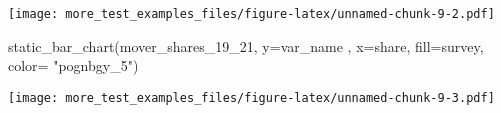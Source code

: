 \documentclass[
]{article}
\newenvironment{Shaded}{\begin{snugshade}}{\end{snugshade}}
\newcommand{\AttributeTok}[1]{\textcolor[rgb]{0.77,0.63,0.00}{#1}}
\newcommand{\FunctionTok}[1]{\textcolor[rgb]{0.00,0.00,0.00}{#1}}
\newcommand{\NormalTok}[1]{#1}
\newcommand{\StringTok}[1]{\textcolor[rgb]{0.31,0.60,0.02}{#1}}
\begin{document}
\texttt{[image: more\_test\_examples\_files/figure-latex/unnamed-chunk-9-2.pdf]}

\begin{Shaded}
\begin{Highlighting}[]
\FunctionTok{static\_bar\_chart}\NormalTok{(mover\_shares\_19\_21, }\AttributeTok{y=}\StringTok{\textquotesingle{}var\_name\textquotesingle{}}\NormalTok{ , }\AttributeTok{x=}\StringTok{\textquotesingle{}share\textquotesingle{}}\NormalTok{, }\AttributeTok{fill=}\StringTok{\textquotesingle{}survey\textquotesingle{}}\NormalTok{, }\AttributeTok{color=} \StringTok{"pognbgy\_5"}\NormalTok{)}
\end{Highlighting}
\end{Shaded}

\texttt{[image: more\_test\_examples\_files/figure-latex/unnamed-chunk-9-3.pdf]}
\end{document}

